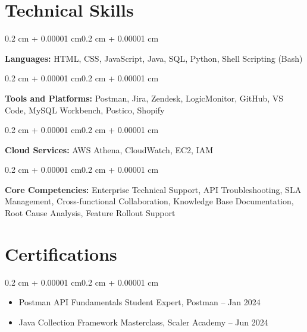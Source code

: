 \documentclass[10pt, letterpaper]{article}
\newenvironment{highlights}{
    \begin{itemize}[
        topsep=0.10 cm,
        parsep=0.10 cm,
        partopsep=0pt,
        itemsep=0pt,
        leftmargin=0.4 cm + 10pt
    ]
}{
    \end{itemize}
}
\newenvironment{onecolentry}{
    \begin{adjustwidth}{0.2 cm + 0.00001 cm}{0.2 cm + 0.00001 cm}
}{
    \end{adjustwidth}
}
\begin{document}
    \section{Technical Skills}

    \begin{onecolentry}
        \textbf{Languages:} HTML, CSS, JavaScript, Java, SQL, Python, Shell Scripting (Bash)
    \end{onecolentry}

    \vspace{0.2 cm}

    \begin{onecolentry}
        \textbf{Tools and Platforms:} Postman, Jira, Zendesk, LogicMonitor, GitHub, VS Code, MySQL Workbench, Postico, Shopify
    \end{onecolentry}

    \vspace{0.2 cm}

    \begin{onecolentry}
        \textbf{Cloud Services:} AWS Athena, CloudWatch, EC2, IAM
    \end{onecolentry}

    \vspace{0.2 cm}

    \begin{onecolentry}
        \textbf{Core Competencies:} Enterprise Technical Support, API Troubleshooting, SLA Management, Cross-functional Collaboration, Knowledge Base Documentation, Root Cause Analysis, Feature Rollout Support
    \end{onecolentry}


    \section{Certifications}

    \vspace{0.10 cm}
    \begin{onecolentry}
        \begin{highlights}
            \item Postman API Fundamentals Student Expert, Postman -- Jan 2024
            \item Java Collection Framework Masterclass, Scaler Academy -- Jun 2024
        \end{highlights}
    \end{onecolentry}

    \vspace{-0.3cm}
\end{document}
